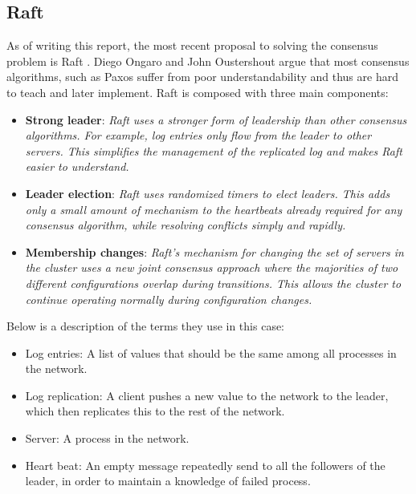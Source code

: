 \subsection{Raft}
As of writing this report, the most recent proposal to solving the consensus problem is Raft \cite{Raft}. Diego Ongaro and John Oustershout argue that most consensus algorithms, such as Paxos \cite{Paxos} suffer from poor understandability and thus are hard to teach and later implement. Raft is composed with three main components:
\begin{itemize}
\item \textbf{Strong leader}: \textit{Raft uses a stronger form of leadership than other consensus algorithms. For example, log entries only flow from the leader to other servers. This simplifies the management of the replicated log and makes Raft easier to understand.}
\item \textbf{Leader election}: \textit{Raft uses randomized timers to elect leaders. This adds only a small amount of mechanism to the heartbeats already required for any consensus algorithm, while resolving conflicts simply and rapidly.}
\item \textbf{Membership changes}: \textit{Raft’s mechanism for changing the set of servers in the cluster uses a new joint consensus approach where the majorities of two different configurations overlap during transitions. This allows the cluster to continue operating normally during configuration changes.} \cite{Raft}
\end{itemize}
Below is a description of the terms they use in this case:
\begin{itemize}
\item Log entries: A list of values that should be the same among all processes in the network.
\item Log replication: A client pushes a new value to the network to the leader, which then replicates this to the rest of the network.
\item Server: A process in the network.
\item Heart beat: An empty message repeatedly send to all the followers of the leader, in order to maintain a knowledge of failed process.
\end{itemize}
